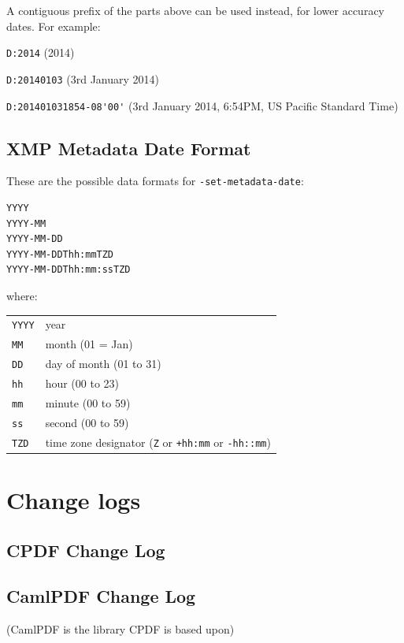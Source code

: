 \documentclass{book}
\begin{document}
\noindent A contiguous prefix of the parts above can be used instead, for lower
accuracy dates. For example:

\begin{framed}
   \small\noindent\verb!D:2014! (2014)
   
   \vspace{1.5mm}
   \noindent\verb!D:20140103! (3rd January 2014)

   \vspace{1.5mm}
   \noindent\verb!D:201401031854-08'00'! (3rd January 2014, 6:54PM, US Pacific Standard Time)
   
\end{framed}

\section{XMP Metadata Date Format}
\label{xmpdate}


These are the possible data formats for \texttt{-set-metadata-date}:

\begin{verbatim}
YYYY
YYYY-MM
YYYY-MM-DD
YYYY-MM-DDThh:mmTZD
YYYY-MM-DDThh:mm:ssTZD
\end{verbatim}

\noindent where:

\medskip
\begin{tabular}{ll}
\texttt{YYYY} & year \\
\texttt{MM} & month (01 = Jan)\\
\texttt{DD} & day of month (01 to 31)\\
\texttt{hh} & hour (00 to 23)\\
\texttt{mm} & minute (00 to 59)\\
\texttt{ss} & second (00 to 59)\\
\texttt{TZD} & time zone designator (\texttt{Z} or \texttt{+hh:mm} or \texttt{-hh::mm})
\end{tabular}
\pagestyle{fancy}

\chapter{Change logs}\pagestyle{empty}

\section{CPDF Change Log}
{\footnotesize\begin{alltt}

\end{alltt}}

\section{CamlPDF Change Log}
(CamlPDF is the library CPDF is based upon)

{\footnotesize\begin{alltt}

\end{alltt}}


\end{document}
